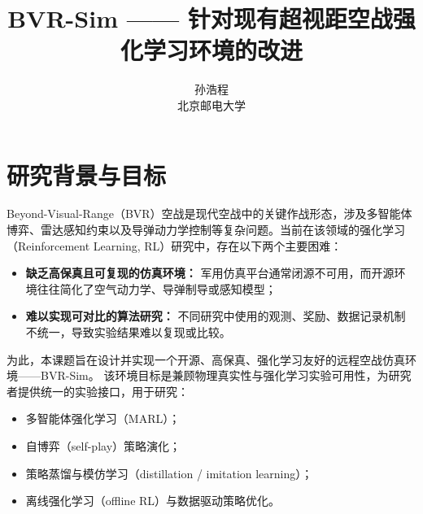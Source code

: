 \documentclass[11pt,a4paper]{article}
\title{\textbf{BVR-Sim —— 针对现有超视距空战强化学习环境的改进}}
\author{孙浩程 \\ 北京邮电大学}
\date{}
\begin{document}
\maketitle

\section{研究背景与目标}

Beyond-Visual-Range（BVR）空战是现代空战中的关键作战形态，涉及多智能体博弈、雷达感知约束以及导弹动力学控制等复杂问题。当前在该领域的强化学习（Reinforcement Learning, RL）研究中，存在以下两个主要困难：

\begin{itemize}
    \item \textbf{缺乏高保真且可复现的仿真环境：} 军用仿真平台通常闭源不可用，而开源环境往往简化了空气动力学、导弹制导或感知模型；
    \item \textbf{难以实现可对比的算法研究：} 不同研究中使用的观测、奖励、数据记录机制不统一，导致实验结果难以复现或比较。
\end{itemize}

为此，本课题旨在设计并实现一个开源、高保真、强化学习友好的远程空战仿真环境——BVR-Sim。  
该环境目标是兼顾物理真实性与强化学习实验可用性，为研究者提供统一的实验接口，用于研究：
\begin{itemize}
    \item 多智能体强化学习（MARL）；
    \item 自博弈（self-play）策略演化；
    \item 策略蒸馏与模仿学习（distillation / imitation learning）；
    \item 离线强化学习（offline RL）与数据驱动策略优化。
\end{itemize}




\end{document}
